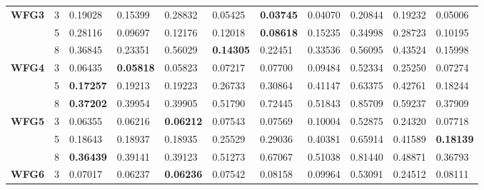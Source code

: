 \documentclass[conference]{IEEEtran}
\begin{document}
\begin{table*}[!htb]
\begin{tabular}{|l|l|l|l|l|l|l|l|l|l|l|}
		\textbf{WFG3}    & 3          & 0.19028          & 0.15399           & 0.28832               & 0.05425          & \textbf{0.03745}    & 0.04070             & 0.20844            & 0.19232              & 0.05006          \\ \cline{2-11} 
		\textbf{}        & 5          & 0.28116          & 0.09697           & 0.12176               & 0.12018          & \textbf{0.08618}    & 0.15235             & 0.34998            & 0.28723              & 0.10195          \\ \cline{2-11} 
		\textbf{}        & 8          & 0.36845          & 0.23351           & 0.56029               & \textbf{0.14305} & 0.22451             & 0.33536             & 0.56095            & 0.43524              & 0.15998          \\ \hline
		\textbf{WFG4}    & 3          & 0.06435          & \textbf{0.05818}  & 0.05823               & 0.07217          & 0.07700             & 0.09484             & 0.52334            & 0.25250              & 0.07274          \\ \cline{2-11} 
		\textbf{}        & 5          & \textbf{0.17257} & 0.19213           & 0.19223               & 0.26733          & 0.30864             & 0.41147             & 0.63375            & 0.42761              & 0.18244          \\ \cline{2-11} 
		\textbf{}        & 8          & \textbf{0.37202} & 0.39954           & 0.39905               & 0.51790          & 0.72445             & 0.51843             & 0.85709            & 0.59237              & 0.37909          \\ \hline
		\textbf{WFG5}    & 3          & 0.06355          & 0.06216           & \textbf{0.06212}      & 0.07543          & 0.07569             & 0.10004             & 0.52875            & 0.24320              & 0.07718          \\ \cline{2-11} 
		\textbf{}        & 5          & 0.18643          & 0.18937           & 0.18935               & 0.25529          & 0.29036             & 0.40381             & 0.65914            & 0.41589              & \textbf{0.18139} \\ \cline{2-11} 
		\textbf{}        & 8          & \textbf{0.36439} & 0.39141           & 0.39123               & 0.51273          & 0.67067             & 0.51038             & 0.81440            & 0.48871              & 0.36793          \\ \hline
		\textbf{WFG6}    & 3          & 0.07017          & 0.06237           & \textbf{0.06236}      & 0.07542          & 0.08158             & 0.09964             & 0.53091            & 0.24512              & 0.08111          \\ \cline{2-11} 

\end{tabular}
\end{table*}
\end{document}
